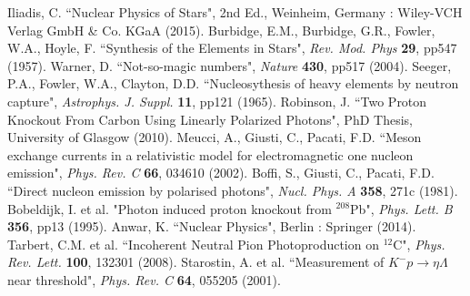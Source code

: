 \documentclass[a4paper,12pt]{article}
\begin{document}
\begin{thebibliography}{99}
 Iliadis, C. ``Nuclear Physics of Stars", 2nd Ed., Weinheim, Germany : Wiley-VCH Verlag GmbH \& Co. KGaA (2015).
 Burbidge, E.M., Burbidge, G.R., Fowler, W.A., Hoyle, F. ``Synthesis of the Elements in Stars", \textit{Rev. Mod. Phys} \textbf{29}, pp547 (1957).
 Warner, D. ``Not-so-magic numbers", \textit{Nature} \textbf{430}, pp517 (2004).
 Seeger, P.A., Fowler, W.A., Clayton, D.D. ``Nucleosythesis of heavy elements by neutron capture", \textit{Astrophys. J. Suppl.} \textbf{11}, pp121 (1965).
 Robinson, J. ``Two Proton Knockout From Carbon Using Linearly Polarized Photons", PhD Thesis, University of Glasgow (2010).
 Meucci, A., Giusti, C., Pacati, F.D. ``Meson exchange currents in a relativistic model for electromagnetic one nucleon emission", \textit{Phys. Rev. C} \textbf{66}, 034610 (2002).
 Boffi, S., Giusti, C., Pacati, F.D. ``Direct nucleon emission by polarised photons", \textit{Nucl. Phys. A} \textbf{358}, 271c (1981).
 Bobeldijk, I. et al. "Photon induced proton knockout from $^{208}$Pb", \textit{Phys. Lett. B} \textbf{356}, pp13 (1995). 
 Anwar, K. ``Nuclear Physics", Berlin : Springer (2014).
 Tarbert, C.M. et al. ``Incoherent Neutral Pion Photoproduction on $^{12}$C", \textit{Phys. Rev. Lett.} \textbf{100}, 132301 (2008).
 Starostin, A. et al. ``Measurement of $K^{-}p \rightarrow \eta \Lambda$ near threshold", \textit{Phys. Rev. C} \textbf{64}, 055205 (2001).

\end{thebibliography}
\end{document}
